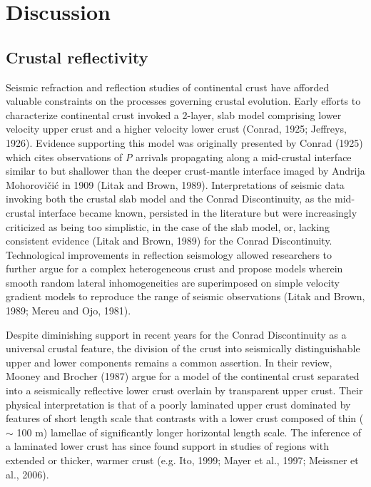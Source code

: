 \documentclass[msc,oneside]{ubcthesis}
\begin{document}
\chapter{Discussion} \label{cha:discussion}

\section{Crustal reflectivity}
Seismic refraction and reflection studies of continental crust have afforded valuable constraints on the processes governing crustal evolution. Early efforts to characterize continental crust invoked a 2-layer, slab model comprising lower velocity upper crust and a higher velocity lower crust (Conrad, 1925; Jeffreys, 1926). Evidence supporting this model was originally presented by Conrad (1925) which cites observations of {\it P} arrivals propagating along a mid-crustal interface similar to but shallower than the deeper crust-mantle interface imaged by Andrija Mohorovi\v{c}i\'{c} in 1909 (Litak and Brown, 1989). Interpretations of seismic data invoking both the crustal slab model and the Conrad Discontinuity, as the mid-crustal interface became known, persisted in the literature but were increasingly criticized as being too simplistic, in the case of the slab model, or, lacking consistent evidence (Litak and Brown, 1989) for the Conrad Discontinuity. Technological improvements in reflection seismology allowed researchers to further argue for a complex heterogeneous crust and propose models wherein smooth random lateral inhomogeneities are superimposed on simple velocity gradient models to reproduce the range of seismic observations (Litak and Brown, 1989; Mereu and Ojo, 1981).

Despite diminishing support in recent years for the Conrad Discontinuity as a universal crustal feature, the division of the crust into seismically distinguishable upper and lower components remains a common assertion. In their review, Mooney and Brocher (1987) argue for a model of the continental crust separated into a seismically reflective lower crust overlain by transparent upper crust. Their physical interpretation is that of a poorly laminated upper crust dominated by features of short length scale that contrasts with a lower crust composed of thin ($\sim$ 100 m) lamellae of significantly longer horizontal length scale. The inference of a laminated lower crust has since found support in studies of regions with extended or thicker, warmer crust (e.g. Ito, 1999; Mayer et al., 1997; Meissner et al., 2006).
\end{document}

